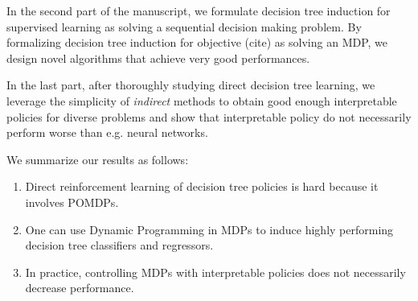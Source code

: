 In the second part of the manuscript, we formulate decision tree induction for supervised learning as solving a sequential decision making problem.
By formalizing decision tree induction for objective (cite) as solving an MDP, we design novel algorithms that achieve very good performances.

In the last part, after thoroughly studying direct decision tree learning, we leverage the simplicity of \textit{indirect} methods to obtain good enough interpretable policies for diverse problems and show that interpretable policy do not necessarily perform worse than e.g. neural networks.

We summarize our results as follows:

\begin{enumerate}
    \item Direct reinforcement learning of decision tree policies is hard because it involves POMDPs.
    \item One can use Dynamic Programming in MDPs to induce highly performing decision tree classifiers and regressors.
    \item In practice, controlling MDPs with interpretable policies does not necessarily decrease performance.
\end{enumerate}

        
        
        
        

